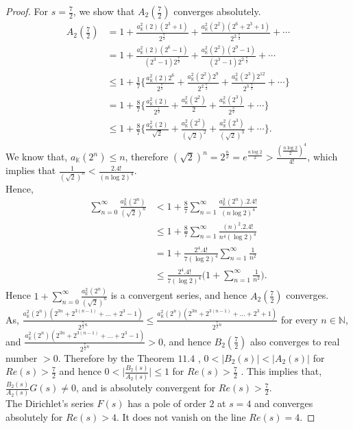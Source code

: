 \documentclass[preprint,12pt]{elsarticle}
\numberwithin{equation}{section}
\begin{document}
\begin{proof}
	\noindent For $s=\frac{7}{2}$, we show that $A_{2}(\frac{7}{2})$ converges absolutely. 
	\begin{align*}
		A_{2}(\frac{7}{2})&=1+\frac{a_{\mathbb{K}}^{2}(2)(2^{3}+1)}{2^{\frac{7}{2}}}+\frac{a_{\mathbb{K}}^{2}(2^{2})(2^{6}+2^{3}+1)}{2^{2.\frac{7}{2}}}+\cdots\\
		&=1+\frac{a_{\mathbb{K}}^{2}(2)(2^{6}-1)}{(2^{3}-1)2^{\frac{7}{2}}}+\frac{a_{\mathbb{K}}^{2}(2^{2})(2^{9}-1)}{(2^{3}-1)2^{2.\frac{7}{2}}}+\cdots\\
		&\leq 1+\frac{1}{7}\Big\{\frac{a_{\mathbb{K}}^{2}(2)2^{6}}{2^{\frac{7}{2}}}+\frac{a_{\mathbb{K}}^{2}(2^{2})2^{9}}{2^{2.\frac{7}{2}}}+\frac{a_{\mathbb{K}}^{2}(2^{3})2^{12}}{2^{3.\frac{7}{2}}}+\cdots\Big\}\\
		&=1+\frac{8}{7}\Big\{\frac{a_{\mathbb{K}}^{2}(2)}{2^{\frac{1}{2}}}+\frac{a_{\mathbb{K}}^{2}(2^{2})}{2}+\frac{a_{\mathbb{K}}^{2}(2^{3})}{2^{\frac{3}{2}}}+\cdots\Big\}\\
		&\leq 1+\frac{8}{7}\Big\{\frac{a_{\mathbb{K}}^{2}(2)}{\sqrt{2}}+\frac{a_{\mathbb{K}}^{2}(2^{2})}{(\sqrt{2})^{2}}+\frac{a_{\mathbb{K}}^{2}(2^{3})}{(\sqrt{2})^{3}}+\cdots\Big\}.
	\end{align*}
	We know that, $a_{\mathbb{K}}(2^{n})\leq n$, therefore $(\sqrt{2})^{n}=2^{\frac{n}{2}}=e^{\frac{n\log{2}}{2}}>\frac{(\frac{n\log{2}}{2})^{4}}{4!}$, which implies that $\frac{1}{(\sqrt{2})^{n}}<\frac{2.4!}{(n\log{2})^{4}}$.\\
	Hence,
	\begin{align*}
		\sum_{n=0}^{\infty} \frac{a_{\mathbb{K}}^{2}(2^{n})}{(\sqrt{2})^{n}}&< 1+\frac{8}{7}\sum_{n=1}^{\infty}\frac{a_{\mathbb{K}}^{2}(2^{n}).2.4!}{(n\log{2})^{4}}\\
		&\leq 1+\frac{8}{7}\sum_{n=1}^{\infty} \frac{(n)^{2}.2.4!}{n^{4}(\log{2})^{4}}\\
		&=1+\frac{2^{4}.4!}{7(\log 2)^{4}}\sum_{n=1}^{\infty} \frac{1}{n^{2}}\\
		&\leq\frac{2^{4}.4!}{7(\log 2)^{4}}\Big(1+\sum_{n=1}^{\infty}\frac{1}{n^{2}}\Big).
	\end{align*}
	Hence $1+\sum_{n=0}^{\infty} \frac{a_{\mathbb{K}}^{2}(2^{n})}{(\sqrt{2})^{n}}$ is a convergent series, and hence $A_{2}(\frac{7}{2})$ converges.\\
	As, $\frac{a_{\mathbb{K}}^{2}(2^{n})(2^{3n}+2^{3(n-1)}+\dots+2^{3}-1)}{2^{\frac{7}{2}n}}\leq\frac{a_{\mathbb{K}}^{2}(2^{n})(2^{3n}+2^{3(n-1)}+\dots+2^{3}+1)}{2^{\frac{7}{2}n}}$ for every $n\in \mathbb{N}$, and $\frac{a_{\mathbb{K}}^{2}(2^{n})(2^{3n}+2^{3(n-1)}+\dots+2^{3}-1)}{2^{\frac{7}{2}n}}>0$, and hence $B_{2}(\frac{7}{2})$ also converges to real number $>0$. Therefore by the Theorem $11.4$ \cite{apostol}, $0<|B_{2}(s)|<|A_{2}(s)|$ for $Re(s)>\frac{7}{2}$ and hence $0<\big|\frac{B_{2}(s)}{A_{2}(s)}\big|\leq 1$ for $Re(s)>\frac{7}{2}$ .
	This implies that, $\frac{B_{2}(s)}{A_{2}(s)}G(s)\neq 0$, and is absolutely convergent for $Re(s)>\frac{7}{2}$.\\
	The Dirichlet's series $F(s)$ has a pole of order $2$ at $s=4$ and converges absolutely for $Re(s)>4$. It does not vanish on the line $Re(s)=4.$
\end{proof}
\end{document}
